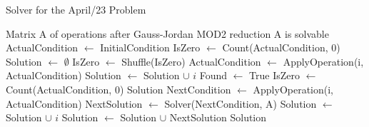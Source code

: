 \documentclass[a4paper,11pt]{article}
\begin{document}
 
\begin{algorithm}
	\caption{Solver for the April/23 Problem} 
	\begin{algorithmic}
        \Require Matrix A of operations after Gauss-Jordan MOD2 reduction
        \Ensure A is solvable
        \State ActualCondition $\leftarrow$ InitialCondition
        \State IsZero $\leftarrow$ Count(ActualCondition, $0$)
        \State Solution $\leftarrow$ $\emptyset$
            \State IsZero $\leftarrow$ Shuffle(IsZero) 
                    \State ActualCondition $\leftarrow$ ApplyOperation(i, ActualCondition)
                    \State Solution $\leftarrow$ Solution $\cup$ $i$
                    \State Found $\leftarrow$ True
                \EndIf
            \EndFor
            \State IsZero $\leftarrow$ Count(ActualCondition, $0$)
        \EndWhile
            \Return Solution
        \Else
                \State NextCondition $\leftarrow$ ApplyOperation(i, ActualCondition)
                \State NextSolution $\leftarrow$ Solver(NextCondition, A)
                    \State Solution $\leftarrow$ Solution $\cup$ $i$
                    \State Solution $\leftarrow$ Solution $\cup$ NextSolution
                    \Return Solution
        \EndIf
	\end{algorithmic} 
\end{algorithm}
\end{document}
